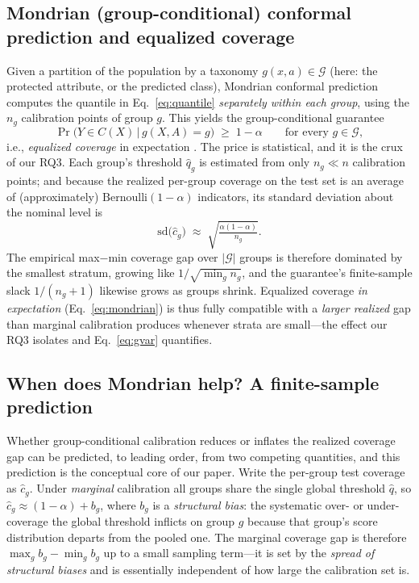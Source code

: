 \documentclass[review,12pt]{elsarticle}
\begin{document}
\subsection{Mondrian (group-conditional) conformal prediction and equalized coverage}
Given a partition of the population by a taxonomy $g(x,a) \in \mathcal{G}$ (here: the protected attribute, or the predicted class), Mondrian conformal prediction \cite{vovk2003} computes the quantile in Eq.~\eqref{eq:quantile} \emph{separately within each group}, using the $n_g$ calibration points of group $g$. This yields the group-conditional guarantee
\begin{equation}
\Pr\big(Y \in C(X) \,\big|\, g(X,A) = g\big) \;\ge\; 1-\alpha \qquad \text{for every } g \in \mathcal{G},
\label{eq:mondrian}
\end{equation}
i.e., \emph{equalized coverage} in expectation \cite{romano2020eq}. The price is statistical, and it is the crux of our RQ3. Each group's threshold $\hat q_g$ is estimated from only $n_g \ll n$ calibration points; and because the realized per-group coverage on the test set is an average of (approximately) $\mathrm{Bernoulli}(1-\alpha)$ indicators, its standard deviation about the nominal level is
\begin{equation}
\mathrm{sd}\big(\hat c_g\big) \;\approx\; \sqrt{\tfrac{\alpha(1-\alpha)}{n_g}} .
\label{eq:gvar}
\end{equation}
The empirical max$-$min coverage gap over $|\mathcal{G}|$ groups is therefore dominated by the smallest stratum, growing like $1/\sqrt{\min_g n_g}$, and the guarantee's finite-sample slack $1/(n_g+1)$ likewise grows as groups shrink. Equalized coverage \emph{in expectation} (Eq.~\eqref{eq:mondrian}) is thus fully compatible with a \emph{larger realized} gap than marginal calibration produces whenever strata are small---the effect our RQ3 isolates and Eq.~\eqref{eq:gvar} quantifies.

\subsection{When does Mondrian help? A finite-sample prediction}
\label{sec:theory}
Whether group-conditional calibration reduces or inflates the realized coverage gap can be predicted, to leading order, from two competing quantities, and this prediction is the conceptual core of our paper. Write the per-group test coverage as $\hat c_g$. Under \emph{marginal} calibration all groups share the single global threshold $\hat q$, so $\hat c_g \approx (1-\alpha) + b_g$, where $b_g$ is a \emph{structural bias}: the systematic over- or under-coverage the global threshold inflicts on group $g$ because that group's score distribution departs from the pooled one. The marginal coverage gap is therefore $\max_g b_g - \min_g b_g$ up to a small sampling term---it is set by the \emph{spread of structural biases} and is essentially independent of how large the calibration set is.
\end{document}
